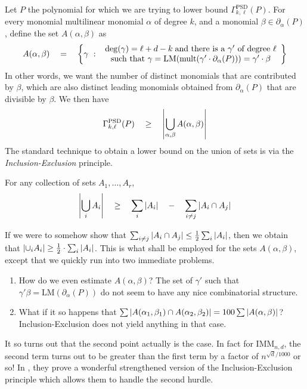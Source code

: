 \documentclass[12pt]{report}
\newcommand{\IMM}{\mathrm{IMM}}
\begin{document}
Let $P$ the polynomial for which we are trying to lower bound $\Gamma^{\mathrm{PSD}}_{k,\ell}(P)$. For every monomial multilinear monomial $\alpha$ of degree $k$, and a monomial $\beta \in \partial_\alpha(P)$, define the set $A(\alpha, \beta)$ as
\[
A(\alpha, \beta) \quad = \quad \left\{{\gamma}\ : \ {\begin{array}{c}\deg(\gamma) = \ell + d - k\;\text{and there is a $\gamma'$ of degree $\ell$}\\\text{such that }\gamma  = \mathrm{LM}(\mathrm{mult}(\gamma' \cdot \partial_\alpha(P))) = \gamma' \cdot \beta \end{array}}\right\}
\]
In other words, we want the number of distinct monomials that are contributed by $\beta$, which are also distinct leading monomials obtained from $\partial_\alpha(P)$ that are divisible by $\beta$. We then have
\begin{equation}\label{eqn:union-of-As}
\Gamma^{\mathrm{PSD}}_{k,\ell}(P) \quad \geq \quad \left|\bigcup_{\alpha, \beta} A(\alpha, \beta)\right|
\end{equation}
The standard technique to obtain a lower bound on the union of sets is via the \emph{Inclusion-Exclusion} principle. 

\begin{lemma}\label{lem:inc-exc}
For any collection of sets $A_1,\dots, A_r$,
\[
\left|\bigcup_i A_i\right| \quad \geq \quad \sum_{i} \left|A_i\right| \quad - \quad \sum_{i\neq j}\left|A_i\cap A_j\right|
\]
\end{lemma}

If we were to somehow show that $\sum_{i\neq j}\left|A_i\cap A_j\right| \leq \frac{1}{2}\sum_i \left|A_i\right|$, then we obtain that $\left|\cup_i A_i\right| \geq \frac{1}{2}\cdot \sum_i \left|A_i\right|$. This is what shall be employed for the sets $A(\alpha, \beta)$, except that we quickly run into two immediate problems. 

\begin{enumerate}
  \item How do we even estimate $A(\alpha, \beta)$? The set of $\gamma'$ such that $\gamma' \beta = \mathrm{LM}(\partial_\alpha(P))$ do not seem to have any nice combinatorial structure. 
  \item What if it so happens that $\sum \left|A(\alpha_1,\beta_1)\cap A(\alpha_2,\beta_2)\right| = 100 \sum \left|A(\alpha,\beta)\right|$? Inclusion-Exclusion does not yield anything in that case. 
\end{enumerate}


It so turns out that the second point actually is the case. In fact for $\IMM_{n,d}$, the second term turns out to be greater than the first term by a factor of $n^{\sqrt{d}/1000}$ or so! In \cite{KS14}, they prove a wonderful strengthened version of the Inclusion-Exclusion principle which allows them to handle the second hurdle. 
\end{document}
